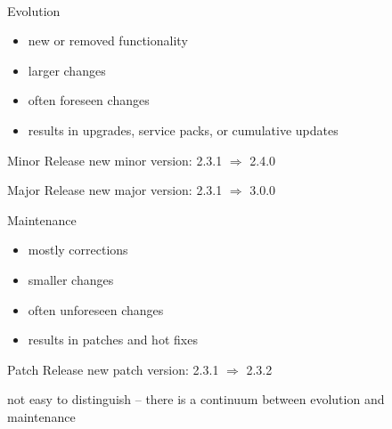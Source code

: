 \begin{frame}{\myframetitle\ \mytitlesource{\ludewiglichter}}
	\begin{mycolumns}[t]
		\begin{definition}{Evolution}
			\begin{itemize}
				\item new or removed functionality
				\item larger changes
				\item often foreseen changes
				\item results in upgrades, service packs, or cumulative updates
			\end{itemize}
		\end{definition}
		\begin{example}{Minor Release}
			new minor version: 2.3.1 $\Rightarrow$ 2.4.0
		\end{example}
		\begin{example}{Major Release}
			new major version: 2.3.1 $\Rightarrow$ 3.0.0
		\end{example}
	\mynextcolumn
		\begin{definition}{Maintenance}
			\begin{itemize}
				\item mostly corrections
				\item smaller changes
				\item often unforeseen changes
				\item results in patches and hot fixes
			\end{itemize}
		\end{definition}
		\begin{example}{Patch Release}
			new patch version: 2.3.1 $\Rightarrow$ 2.3.2
		\end{example}
	\end{mycolumns}
	\pause\pause\begin{note}{}
		\centering not easy to distinguish -- there is a continuum between evolution and maintenance
	\end{note}
\end{frame}

